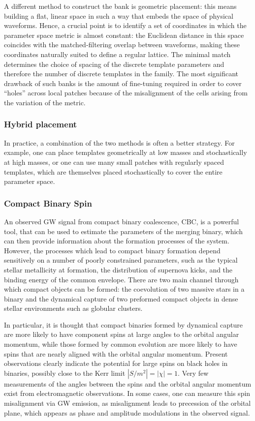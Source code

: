\documentclass[binding=0.6cm, LaM]{sapthesis}
\begin{document}
	A different method to construct the bank is geometric placement:
	this means building a flat, linear space in such a way that embeds the space of physical waveforms. 
	Hence, a crucial point is to identify a set of coordinates 
	in which the parameter space metric is almost constant: 
	the Euclidean distance in this space coincides with the matched-filtering overlap 
	between waveforms, making these coordinates naturally suited to define a regular lattice. 
	The minimal match determines the choice of spacing of the discrete template parameters 
	and therefore the number of discrete templates in the family.
	The most significant drawback of such banks is the amount of fine-tuning required 
	in order to cover “holes” across local patches because of the misalignment 
	of the cells arising from the variation of the metric. 

\subsubsection{Hybrid placement}

	In practice, a combination of the two methods is often a better strategy. 
	For example, one can place templates geometrically at low masses 
	and stochastically at high masses, or one can use many small patches 
	with regularly spaced templates, which are themselves placed stochastically 
	to cover the entire parameter space. 

\subsubsection{Compact Binary Spin}

	An observed GW signal from compact  binary coalescence, CBC, is a powerful tool, 
	that can be used to estimate the parameters of the merging binary,
	which can then provide information about the formation processes of the system. 
	However, the processes which lead to compact binary formation  
	depend sensitively on a number of poorly constrained parameters, 
	such as the typical stellar metallicity at formation, 
	the distribution of supernova kicks, 
	and the binding energy of the common envelope. 
	There are two main channel through which compact objects can be formed:
	the coevolution of two massive stars in a binary and 
	the dynamical capture of two preformed compact objects 
	in dense stellar environments such as globular clusters.
	
	In particular, it is thought that compact binaries formed by dynamical capture 
	are more likely to have component spins
	at large angles to the orbital angular momentum, 
	while those formed by common evolution are more likely to have 
	spins that are nearly aligned with the orbital angular momentum.
	Present observations clearly indicate the potential for large spins 
	on black holes in binaries, possibly close to the Kerr limit $|S/m^2| = |\chi| = 1$.
	Very few measurements of the angles between the spins and 
	the orbital angular momentum exist from electromagnetic observations. 
	In some cases, one can measure this spin misalignment via GW emission, 
	as misalignment leads to precession of the orbital plane, 
	which appears as phase and amplitude modulations in the observed signal.
\end{document}
